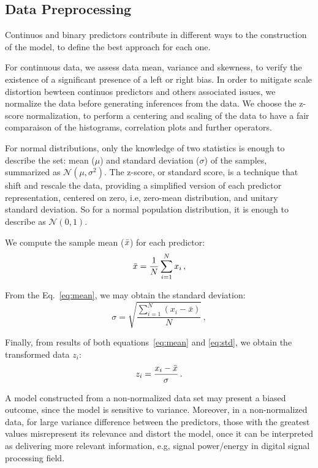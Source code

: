 \subsection{Data Preprocessing}

Continuos and binary predictors contribute in different ways to the construction of the model, to define the best approach for each one. 

For continuous data, we assess data mean, variance and skewness, to verify the existence of a significant presence of a left or right bias. In order to mitigate scale distortion bewteen continuos predictors and others associated issues, we normalize the data before generating inferences from the data. We choose the z-score normalization, to perform a centering and scaling of the data to have a fair comparaison of the histograms, correlation plots and further operators. 

For normal distributions, only the knowledge of two statistics is enough to describe the set: mean ($\mu$) and standard deviation ($\sigma$) of the samples, summarized as $\mathcal{N}(\mu, \sigma^2)$. The z-score, or standard score, is a technique that shift and rescale the data, providing a simplified version of each predictor representation, centered on zero, i.e, zero-mean distribution, and unitary standard deviation. So for a normal population distribution, it is enough to describe as $\mathcal{N}(0, 1)$.

We compute the sample mean ($\Bar{x}$) for each predictor:
\begin{equation}
  \Bar{x} = \frac{1}{N} \sum_{i=1}^{N} x_i \, , \label{eq:mean}
\end{equation}

From the Eq.~\ref{eq:mean}, we may obtain the standard deviation:
\begin{equation}
  \sigma = \sqrt{\frac{\sum_{i=1}^{N} (x_i - \bar{x})}{N}} \, , \label{eq:std}
\end{equation}

Finally, from results of both equations~\ref{eq:mean} and \ref{eq:std}, we obtain the transformed data $z_i$:
\begin{equation}
  z_i = \frac{x_i - \Bar{x}}{\sigma} \, .
\end{equation}

A model constructed from a non-normalized data set may present a biased outcome, since the model is sensitive to variance. Moreover, in a non-normalized data, for large variance difference between the predictors, those with the greatest values misrepresent its relevance and distort the model, once it can be interpreted as delivering more relevant information, e.g, signal power/energy in digital signal processing field.

